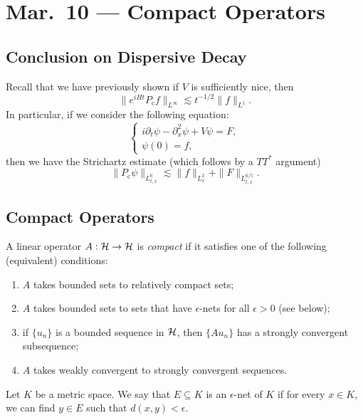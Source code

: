 \chapter{Mar.~10 --- Compact Operators}

\section{Conclusion on Dispersive Decay}
\begin{remark}
  Recall that we have previously shown if
  $V$ is sufficiently nice, then
  \[
    \|e^{iHt} P_{\mathrm{c}} f\|_{L^\infty}
    \lesssim t^{-1 / 2} \|f\|_{L^1}.
  \]
  In particular, if we consider the following equation:
  \[
    \begin{cases}
      i \partial_t \psi - \partial_x^2 \psi + V \psi = F, \\
      \psi(0) = f,
    \end{cases}
  \]
  then we have the Strichartz estimate (which
  follows by a $TT^*$ argument)
  \[
    \|P_{\mathrm{c}} \psi\|_{L^6_{t, x}} \lesssim \|f\|_{L^2_x} + \|F\|_{L^{6 / 5}_{t, x}}.
  \]
\end{remark}

\section{Compact Operators}

\begin{definition}
  A linear operator $A : \mathcal{H} \to \mathcal{H}$ is \emph{compact}
  if it satisfies one of the following (equivalent)
  conditions:
  \begin{enumerate}
    \item $A$ takes bounded sets to relatively
      compact sets;
    \item $A$ takes bounded sets to sets that
      have $\epsilon$-nets for all $\epsilon > 0$ (see below);
    \item if $\{u_n\}$ is a bounded sequence in
      $\mathcal{H}$, then $\{A u_n\}$ has a strongly
      convergent subsequence;
    \item $A$ takes weakly convergent to strongly
      convergent sequences.
  \end{enumerate}
\end{definition}

\begin{definition}
  Let $K$ be a metric space. We say that $E \subseteq K$
  is an $\epsilon$-net of $K$ if for every $x \in K$,
  we can find $y \in E$ such that $d(x, y) < \epsilon$.
\end{definition}

